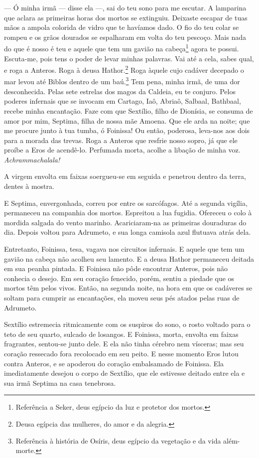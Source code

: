 --- Ó minha irmã --- disse ela ---, sai do teu sono para me escutar. A lamparina que
aclara as primeiras horas dos mortos se extinguiu. Deixaste escapar de
tuas mãos a ampola colorida de vidro que te havíamos dado. O fio do teu
colar se rompeu e os grãos dourados se espalharam em volta do teu pescoço.
Mais nada do que é nosso é teu e aquele que tem um gavião na
cabeça\footnote{ Referência a Seker, deus egípcio da luz e protetor dos mortos.} 
agora te possui. Escuta-me, pois tens o poder de levar
minhas palavras. Vai até a cela, sabes qual, e roga a Anteros. Roga à
deusa Hathor.\footnote{ Deusa egípcia das mulheres, do amor e da alegria.} 
Roga àquele cujo cadáver decepado o mar levou até Biblos dentro
de um baú.\footnote{ Referência à história de Osíris, deus egípcio da
vegetação e da vida além-morte.} Tem pena, minha irmã, de uma dor
desconhecida. Pelas sete estrelas dos magos da Caldeia, eu te conjuro.
Pelos poderes infernais que se invocam em Cartago, Iaô, Abriaô, Salbaal,
Bathbaal, recebe minha encantação. Faze com que Sextílio, filho de
Dionísia, se consuma de amor por mim, Septima, filha de nossa mãe Amoena.
Que ele arda na noite; que me procure junto à tua tumba, ó Foinissa! Ou
então, poderosa, leva-nos aos dois para a morada das trevas. Roga a
Anteros que resfrie nosso sopro, já que ele proíbe a Eros de acendê-lo.
Perfumada morta, acolhe a libação de minha voz. \textit{Achrammachalala!}

A virgem envolta em faixas soergueu-se em seguida e penetrou dentro da
terra, dentes à mostra.

E Septima, envergonhada, correu por entre os sarcófagos. Até a segunda
vigília, permaneceu na companhia dos mortos. Espreitou a lua fugidia.
Ofereceu o colo à mordida salgada do vento marinho. Acariciaram-na as
primeiras douraduras do dia. Depois voltou para Adrumeto, e sua longa
camisola azul flutuava atrás dela.

Entretanto, Foinissa, tesa, vagava nos circuitos infernais. E aquele que tem
um gavião na cabeça não acolheu seu lamento. E a deusa Hathor permaneceu
deitada em sua peanha pintada. E Foinissa não pôde encontrar Anteros, pois
não conhecia o desejo. Em seu coração fenecido, porém, sentiu a piedade
que os mortos têm pelos vivos. Então, na segunda noite, na hora em que os
cadáveres se soltam para cumprir as encantações, ela moveu seus pés atados
pelas ruas de Adrumeto.

Sextílio estremecia ritmicamente com os suspiros do sono, o rosto voltado
para o teto de seu quarto, sulcado de losangos. E Foinissa, morta, envolta
em faixas fragrantes, sentou-se junto dele. E ela não tinha cérebro nem
vísceras; mas seu coração ressecado fora recolocado em seu peito. E nesse
momento Eros lutou contra Anteros, e se apoderou do coração embalsamado de
Foinissa. Ela imediatamente desejou o corpo de Sextílio, que ele estivesse
deitado entre ela e sua irmã Septima na casa tenebrosa.

